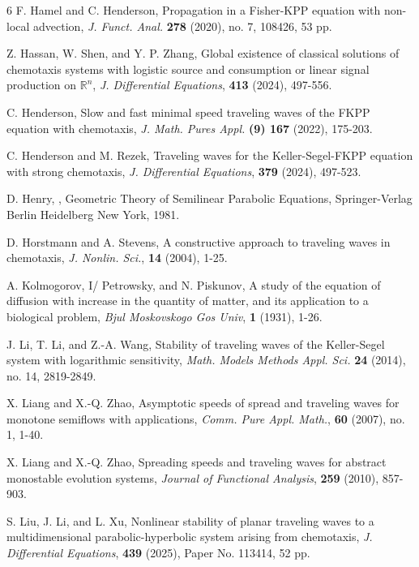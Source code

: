 \documentclass[11pt]{article} %
\theoremstyle{remark}
\theoremstyle{remark}
\numberwithin{equation}{section}
\numberwithin{figure}{section}
\numberwithin{table}{section}
\newcommand\RR{\ensuremath{\mathbb{R}}}
\begin{document}
\begin{thebibliography}{6}
 F. 
Hamel and C. Henderson, 
Propagation in a Fisher-KPP equation with non-local advection, {\it 
J. Funct. Anal. } {\bf 278}  (2020), no. 7, 108426, 53 pp.


 Z. 
Hassan,  W. Shen, and Y. P.  Zhang, 
Global existence of classical solutions of chemotaxis systems with logistic source and consumption or linear signal production on $\RR^n$,  {\it 
J. Differential Equations}, {\bf  413}  (2024), 497-556.


 C. Henderson, 
Slow and fast minimal speed traveling waves of the FKPP equation with chemotaxis, 
{\it J. Math. Pures Appl.} {\bf (9) 167}  (2022), 175-203.


 C. Henderson and M. Rezek, 
Traveling waves for the Keller-Segel-FKPP equation with strong chemotaxis,
{\it 
J. Differential Equations}, {\bf  379}  (2024), 497-523.


 D. Henry, , Geometric Theory of Semilinear Parabolic Equations, Springer-Verlag Berlin Heidelberg New York, 1981.

 D. Horstmann and A. Stevens, A constructive approach to traveling waves in chemotaxis, {\it  J. Nonlin. Sci.}, {\bf 14} (2004), 1-25.



 A.
Kolmogorov, I/  Petrowsky, and N.  Piskunov,  A study of the equation of
  diffusion with increase in the quantity of matter, and its application to a
  biological problem, {\it Bjul Moskovskogo Gos Univ}, {\bf  1} (1931), 1-26.


 J. Li, T. Li, and Z.-A. Wang,
 Stability of traveling waves of the Keller-Segel system with logarithmic sensitivity,
 {\it Math. Models Methods Appl. Sci.} {\bf 24} (2014), no. 14, 2819-2849.


 X. Liang and X.-Q. Zhao,
 Asymptotic speeds of spread and traveling waves for monotone semiflows
  with applications,  {\it Comm. Pure Appl. Math.},  {\bf 60}  (2007),  no. 1,
   1-40.

 X. Liang and X.-Q. Zhao, Spreading speeds and traveling waves for abstract
monostable evolution systems, {\it Journal of Functional Analysis},  {\bf 259} (2010),  857-903.

 S.
Liu, J.  Li, and L. Xu, 
Nonlinear stability of planar traveling waves to a multidimensional parabolic-hyperbolic system arising from chemotaxis,
{\it J. Differential Equations}, {\bf  439} (2025), Paper No. 113414, 52 pp.


\end{thebibliography}
\end{document}
